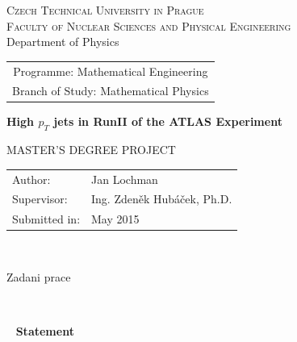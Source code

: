 \documentclass[a4paper,11pt,twoside,openright]{book}
\newcommand{\cvut}{Czech Technical University in Prague}
\newcommand{\fjfi}{Faculty of Nuclear Sciences and Physical Engineering}
\newcommand{\km}{Department of Physics}
\newcommand{\obor}{Mathematical Engineering}
\newcommand{\zamereni}{Mathematical Physics}
\newcommand{\nazeven}{High $\pt$ jets in RunII of the ATLAS Experiment}
\newcommand{\autor}{Jan Lochman}
\newcommand{\rok}{May 2015}
\newcommand{\vedouci}{Ing. Zden\v{e}k Hub\'{a}\v{c}ek, Ph.D.}
\newcommand{\pt}{p_{T}}
\begin{document}
\thispagestyle{empty}

\begin{center}
    {\Large \textsc{\cvut}\\[1.5ex] \textsc{\fjfi}}\\[1.5ex]{\large \textsc \km}
    \vspace{10mm}

    \begin{tabular}{c}
    {Programme: \obor}\\
    {Branch of Study: \zamereni}
    \end{tabular}

    \vspace{10mm} \epsfysize=25mm  \epsfysize=25mm  \vspace{15mm}

   {\huge \bf \nazeven}

   \vspace{15mm}
   {\Large MASTER'S DEGREE PROJECT}

   \vfill
   {\large
    \begin{tabular}{ll}
    Author: & \autor\\
    Supervisor: & \vedouci\\
    Submitted in: & \rok
    \end{tabular}
   }
\end{center}


\newpage  
\thispagestyle{empty} 
~


\newpage  
\thispagestyle{empty} 
Zadani prace


\newpage  
\thispagestyle{empty} 
~


\newpage 
\thispagestyle{empty}  
~
\vfill 
{\bf Statement} 
\end{document}
